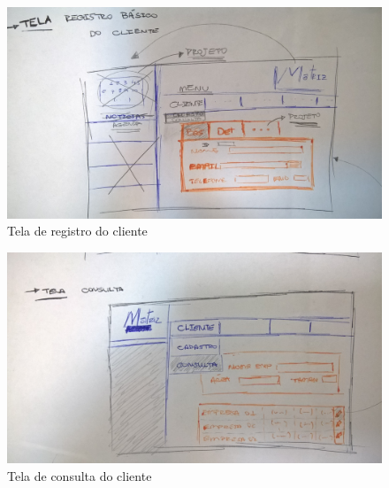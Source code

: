 \begin{apendicesenv}
\begin{figure}[!htb]
\centering
\includegraphics[scale=0.08]{figuras/tela01.jpg}
\caption{Tela de registro do cliente}
\end{figure}

\begin{figure}[!htb]
\centering
\includegraphics[scale=0.08]{figuras/tela02.jpg}
\caption{Tela de consulta do cliente}
\end{figure}

\end{apendicesenv}
